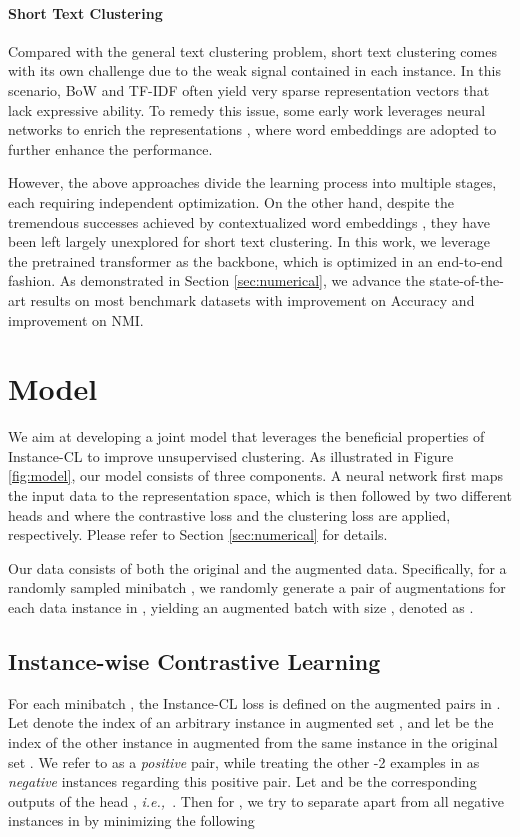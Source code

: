 \documentclass[11pt]{article}
\def\ie{{\em i.e.,~}}
\begin{document}
\paragraph{Short Text Clustering}{Compared with the general text clustering problem, short text clustering comes with its own challenge due to the weak signal contained in each instance. In this scenario, BoW and TF-IDF often yield very sparse representation vectors that lack expressive ability. To remedy this issue, some early work leverages neural networks to enrich the representations \citep{xu2017self, hadifar2019self}, where  word embeddings \citep{mikolov2013distributed, arora2016simple} are adopted to further enhance the performance. 

However, the above approaches divide the learning process into multiple stages, each requiring independent optimization. On the other hand, despite the tremendous successes achieved by contextualized word embeddings \citep{peters2018deep, devlin2019bert, radford2018improving, reimers2019sentence}, 
they have been left largely unexplored for short text clustering. In this work, we leverage the pretrained transformer as the backbone, which is optimized in an end-to-end fashion. As demonstrated in Section \ref{sec:numerical}, we advance the state-of-the-art results on most benchmark datasets with  improvement on Accuracy and  improvement on NMI.
}


\section{Model}
\label{sec:model}
We aim at developing a joint model that leverages the beneficial properties of
Instance-CL to improve unsupervised clustering. As illustrated in Figure \ref{fig:model}, our model consists of three components. A neural network  first maps the input data to the representation space, which is then followed by two different heads  and  where the contrastive loss and the clustering loss are applied, respectively. Please refer to Section \ref{sec:numerical} for details. 


Our data consists of both the original and the augmented data. Specifically, for a randomly sampled minibatch ,  we randomly generate a pair of augmentations for each data instance in , yielding an augmented batch  with size , denoted as . 



\subsection{Instance-wise Contrastive Learning}
\label{subsec:Instance-CL}
For each minibatch , the Instance-CL loss is defined on the augmented pairs in . Let  denote the index of an arbitrary instance in augmented set , and let  be the index of the other instance in  augmented from the same instance in the original set . We refer to  as a \textit{positive} pair, while treating the other -2 examples in  as \textit{negative} instances regarding this positive pair. Let  and  be the corresponding outputs of the head , \ie . Then for , we try to separate  apart from all negative instances in  by minimizing the following
\end{document}
